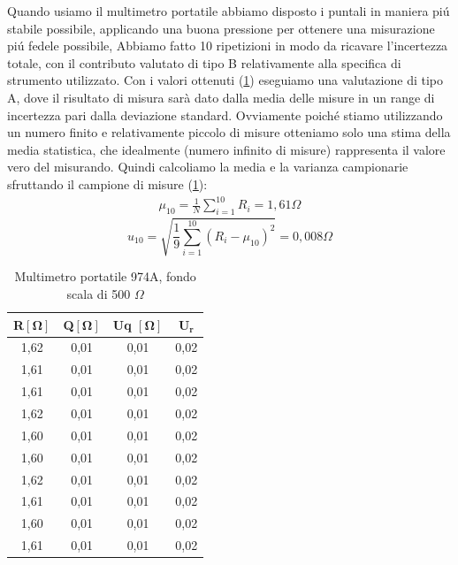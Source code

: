 Quando usiamo il multimetro portatile abbiamo disposto i puntali in maniera pi\'u stabile possibile, applicando una buona pressione per ottenere una misurazione pi\'u fedele possibile,
Abbiamo fatto 10 ripetizioni in modo da ricavare l'incertezza totale, con il contributo valutato di tipo B relativamente alla specifica di strumento utilizzato.
\newline
\newline
Con i valori ottenuti (\ref{tab:mult_port}) eseguiamo una valutazione di tipo A, dove il risultato di misura sarà dato dalla media delle misure in un range di incertezza pari dalla deviazione standard. Ovviamente poich\'e stiamo utilizzando un numero finito e relativamente piccolo di misure otteniamo solo una stima della media statistica, che idealmente (numero infinito di misure) rappresenta il valore vero del misurando. Quindi calcoliamo la media e la varianza campionarie sfruttando il campione di misure (\ref{tab:mult_port}):
\begin{align*}
    \mu_{10}=\frac{1}{N}\sum_{i=1}^{10}R_{i}=1,61\Omega
\end{align*}
\begin{equation*}
    u_{10}=\sqrt{\frac{1}{9}\sum_{i=1}^{10}(R_i-\mu_{10})^{2}}=0,008\Omega 
\end{equation*}
\FloatBarrier

\begin{table}[!ht]
    \centering
    \caption{Multimetro portatile 974A, fondo scala di 500 $\Omega$}
    \begin{tabular}{|c|c|c|c|}
    \hline
        \textbf{R}$\bm{[\Omega]}$ & \textbf{Q}$\bm{[\Omega]}$ & \textbf{Uq} $\bm{[\Omega]}$ & $\bm{U_r}$ \\ \hline
        1,62 & 0,01 & 0,01 & 0,02  \\ \hline
        1,61 & 0,01 & 0,01 & 0,02  \\ \hline
        1,61 & 0,01 & 0,01 & 0,02  \\ \hline
        1,62 & 0,01 & 0,01 & 0,02  \\ \hline
        1,60 & 0,01 & 0,01 & 0,02  \\ \hline
        1,60 & 0,01 & 0,01 & 0,02  \\ \hline
        1,62 & 0,01 & 0,01 & 0,02  \\ \hline
        1,61 & 0,01 & 0,01 & 0,02  \\ \hline
        1,60 & 0,01 & 0,01 & 0,02  \\ \hline
        1,61 & 0,01 & 0,01 & 0,02 \\ \hline
    \end{tabular}
    
    \label{tab:mult_port}
\end{table}
\FloatBarrier


